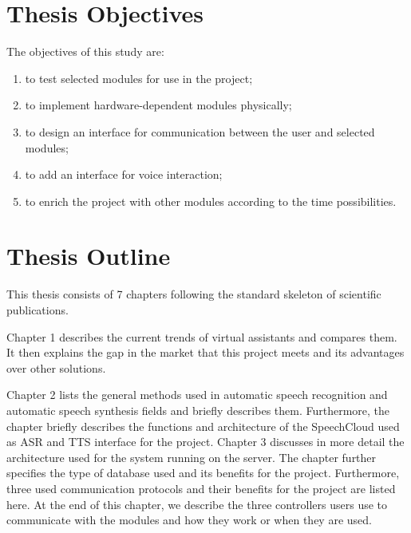 \section{Thesis Objectives} \label{sec:thesis_objectives}






The objectives of this study are:

\begin{enumerate}
    \item to test selected modules for use in the project;
    \item to implement hardware-dependent modules physically;
    \item to design an interface for communication between the user and selected modules;
    \item to add an interface for voice interaction;
    \item to enrich the project with other modules according to the time possibilities.
\end{enumerate}

\section{Thesis Outline} \label{sec:thesis_outline}

This thesis consists of 7 chapters following the standard skeleton of scientific publications.

Chapter 1 describes the current trends of virtual assistants and compares them. It then explains the gap in the market that this project meets and its advantages over other solutions.

Chapter 2 lists the general methods used in automatic speech recognition and automatic speech synthesis fields and briefly describes them. Furthermore, the chapter briefly describes the functions and architecture of the SpeechCloud used as ASR and TTS interface for the project.
\newpage
Chapter 3 discusses in more detail the architecture used for the system running on the server. The chapter further specifies the type of database used and its benefits for the project. Furthermore, three used communication protocols and their benefits for the project are listed here. At the end of this chapter, we describe the three controllers users use to communicate with the modules and how they work or when they are used.

